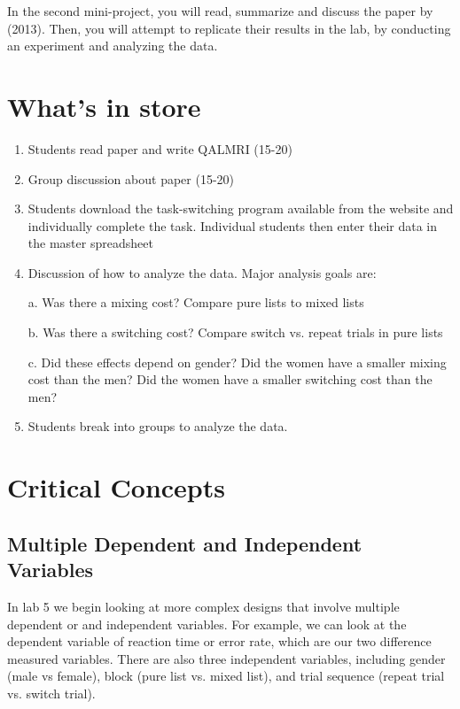 

In the second mini-project, you will read, summarize and discuss the paper by \citeauthor{stoet_are_2013} (2013)\cite{stoet_are_2013}. Then, you will attempt to replicate their results in the lab, by conducting an experiment and analyzing the data.

\section{What's in store}

\begin{enumerate}
\item Students read paper and write QALMRI (15-20)
\item Group discussion about paper (15-20)
\item Students download the task-switching program available from the website and individually complete the task. Individual students then enter their data in the master spreadsheet
\item Discussion of how to analyze the data. Major analysis goals are:

a.	Was there a mixing cost? Compare pure lists to mixed lists

b.	Was there a switching cost? Compare switch vs. repeat trials in pure lists

c.	Did these effects depend on gender? Did the women have a smaller mixing cost than the men? Did the women have a smaller switching cost than the men?

\item Students break into groups to analyze the data.

\end{enumerate}

\section{Critical Concepts}

\subsection{Multiple Dependent and Independent Variables}

In lab 5 we begin looking at more complex designs that involve multiple dependent or and independent variables. For example, we can look at the dependent variable of reaction time or error rate, which are our two difference measured variables. There are also three independent variables, including gender (male vs female), block (pure list vs. mixed list), and trial sequence (repeat trial vs. switch trial). 

